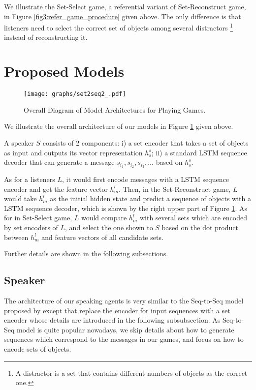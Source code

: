 We illustrate the Set-Select game, a referential variant of Set-Reconstruct game, in Figure \ref{fig3:refer_game_procedure} given above. The only difference is that listeners need to select the correct set of objects among several distractors \footnote{A distractor is a set that contains different numbers of objects as the correct one.} instead of reconstructing it. 

\section{Proposed Models}
\label{sec3.2:models}

\begin{figure}[!h]
  \centering
  \texttt{[image: graphs/set2seq2\_.pdf]}
  \caption{Overall Diagram of Model Architectures for Playing Games.}
  \label{fig4:model_arch}
\end{figure}

We illustrate the overall architecture of our models in Figure \ref{fig4:model_arch} given above. 

A speaker $S$ consists of 2 components: i) a set encoder that takes a set of objects as input and outputs its vector representation $h_s^s$; ii) a standard LSTM sequence decoder that can generate a message $s_{i_1}, s_{i_2}, s_{i_3}, \dots$ based on $h_s^s$. 

As for a listeners $L$, it would first encode messages with a LSTM sequence encoder and get the feature vector $h^l_m$. Then, in the Set-Reconstruct game, $L$ would take $h^l_m$ as the initial hidden state and predict a sequence of objects with a LSTM sequence decoder, which is shown by the right upper part of Figure \ref{fig4:model_arch}. As for in Set-Select game, $L$ would compare $h^l_m$ with several sets which are encoded by set encoders of $L$, and select the one shown to $S$ based on the dot product between $h^l_m$ and feature vectors of all candidate sets.

Further details are shown in the following subsections.

\subsection{Speaker}
\label{ssec3.2.1:speaker}

The architecture of our speaking agents is very similar to the Seq-to-Seq model proposed by \cite{sutskever2014sequence} except that replace the encoder for input sequences with a set encoder whose details are introduced in the following subsubsection. As Seq-to-Seq model is quite popular nowadays, we skip details about how to generate sequences which correspond to the messages in our games, and focus on how to encode sets of objects.

